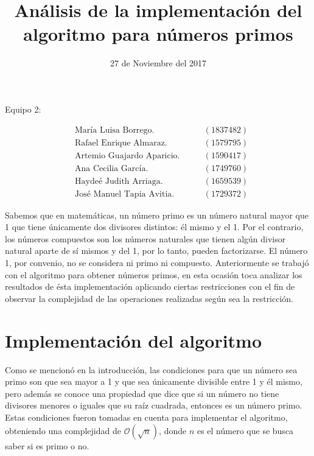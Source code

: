 

\author{
}
\date{
27 de Noviembre del 2017
}
\title{An\'alisis de la implementaci\'on del algoritmo para n\'umeros primos}


\maketitle
\begin{center}
Equipo 2:
\end{center}
\begin{align*}
	&\textrm{Mar\'ia Luisa Borrego.} 					\qquad &(1837482)\\
	&\textrm{Rafael Enrique Almaraz.}				\qquad &(1579795)\\
	&\textrm{Artemio Guajardo Aparicio.} 					\qquad &(1590417)\\
	&\textrm{Ana Cecilia Garc\'ia.}					\qquad &(1749760)\\
	&\textrm{Hayde\'e Judith Arriaga.}				\qquad &(1659539)\\
	&\textrm{Jos\'e Manuel Tapia Avitia.}					\qquad &(1729372)
\end{align*}


Sabemos que en matem\'aticas, un n\'umero primo es un n\'umero natural mayor que 1 que tiene \'unicamente dos divisores distintos: \'el mismo y el 1. Por el contrario, los n\'umeros compuestos son los n\'umeros naturales que tienen alg\'un divisor natural aparte de s\'i mismos y del 1, por lo tanto, pueden factorizarse. El n\'umero 1, por convenio, no se considera ni primo ni compuesto. Anteriormente se trabaj\'o con el algoritmo para obtener n\'umeros primos, en esta ocasi\'on toca analizar los resultados de \'esta implementaci\'on aplicando ciertas restricciones con el fin de observar la complejidad de las operaciones realizadas seg\'un sea la restricci\'on.

\section{Implementaci\'on del algoritmo}



Como se mencion\'o en la introducci\'on, las condiciones para que un n\'umero sea primo son que sea mayor a 1 y que sea \'unicamente divisible entre 1 y \'el mismo, pero adem\'as se conoce una propiedad que dice que si un n\'umero no tiene divisores menores o iguales que su ra\'iz cuadrada, entonces es un n\'umero primo. Estas condiciones fueron tomadas en cuenta para implementar el algoritmo, obteniendo una complejidad de $\mathcal{O}(\sqrt{n})$, donde $n$ es el n\'umero que se busca saber si es primo o no.

